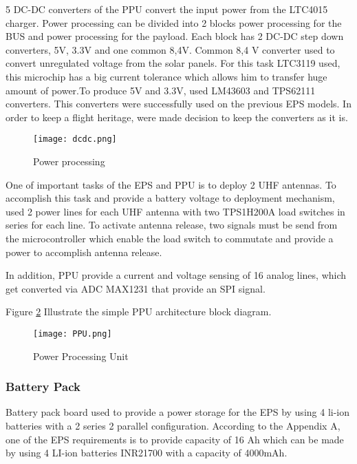   5 DC-DC converters of the PPU convert the input power from the LTC4015 charger. Power processing can be divided into 2 blocks power processing for the BUS and power processing for the payload. Each block has 2 DC-DC step down converters, 5V, 3.3V and one common 8,4V. Common 8,4 V converter used to convert unregulated voltage from the solar panels. For this task LTC3119 used, this microchip has a big current tolerance which allows him to transfer huge amount of power.To produce 5V and 3.3V, used LM43603 and TPS62111 converters. This converters were successfully used on the previous EPS models. In order to keep a flight heritage, were made decision to keep the converters as it is. 
  
   \begin{figure}[h]
   	\centering
   	\texttt{[image: dcdc.png]}
   	\caption{Power processing}
   	\label{fig: ltc4015}
   \end{figure}
  
  One of important tasks of the EPS and PPU is to deploy 2 UHF antennas. To accomplish this task and provide a battery voltage to deployment mechanism, used 2 power lines for each UHF antenna with two TPS1H200A load switches in series for each line. To activate antenna release, two signals must be send from the microcontroller which enable the load switch to commutate and provide a power to accomplish antenna release. 
  
  In addition, PPU provide a current and voltage sensing of 16 analog lines,  which get converted via ADC MAX1231 that provide an SPI signal. 
  
  Figure \ref{fig: PPU} Illustrate the simple PPU architecture block diagram. 
  
  \begin{figure}[h]
  	\centering
  	\texttt{[image: PPU.png]}
  	\caption{Power Processing Unit}
  	\label{fig: PPU}
  \end{figure}
  
     \subsubsection{Battery Pack}
  
 Battery pack board used to provide a power storage for the EPS by using 4 li-ion batteries with a 2 series 2 parallel configuration. According to the Appendix A, one of the EPS requirements is to provide capacity of 16 Ah which can be made by using 4 LI-ion batteries INR21700 with a capacity of 4000mAh.
 
